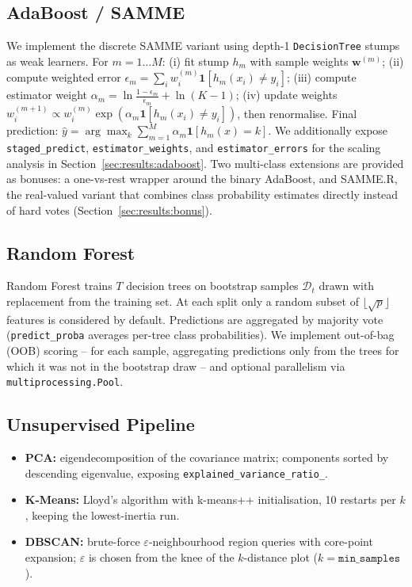 \documentclass[conference]{IEEEtran}
\begin{document}
\subsection{AdaBoost / SAMME}
\label{sec:methods:adaboost}
We implement the discrete SAMME variant \cite{zhu2009multiclass} using depth-1
\texttt{DecisionTree} stumps as weak learners. For $m = 1 \ldots M$: (i) fit
stump $h_m$ with sample weights $\mathbf{w}^{(m)}$; (ii) compute weighted error
$\epsilon_m = \sum_i w_i^{(m)} \mathbf{1}[h_m(x_i)\neq y_i]$; (iii) compute
estimator weight $\alpha_m = \ln\frac{1-\epsilon_m}{\epsilon_m} + \ln(K-1)$;
(iv) update weights $w_i^{(m+1)} \propto w_i^{(m)}
\exp(\alpha_m \mathbf{1}[h_m(x_i)\neq y_i])$, then renormalise. Final prediction:
$\hat{y} = \arg\max_k \sum_{m=1}^{M} \alpha_m \mathbf{1}[h_m(x)=k]$. We additionally
expose \texttt{staged\_predict}, \texttt{estimator\_weights}, and
\texttt{estimator\_errors} for the scaling analysis in
Section~\ref{sec:results:adaboost}. Two multi-class extensions are provided as
bonuses: a one-vs-rest wrapper around the binary AdaBoost, and SAMME.R, the
real-valued variant that combines class probability estimates directly instead
of hard votes (Section~\ref{sec:results:bonus}).

\subsection{Random Forest}
\label{sec:methods:rf}
Random Forest \cite{breiman2001random} trains $T$ decision trees on bootstrap
samples $\mathcal{D}_t$ drawn with replacement from the training set. At each
split only a random subset of $\lfloor\sqrt{p}\rfloor$ features is considered
by default. Predictions are aggregated by majority vote
(\texttt{predict\_proba} averages per-tree class probabilities). We implement
out-of-bag (OOB) scoring -- for each sample, aggregating predictions only from
the trees for which it was not in the bootstrap draw -- and optional
parallelism via \texttt{multiprocessing.Pool}.

\subsection{Unsupervised Pipeline}
\label{sec:methods:unsup}
\begin{itemize}
  \item \textbf{PCA:} eigendecomposition of the covariance matrix; components
        sorted by descending eigenvalue, exposing \texttt{explained\_variance\_ratio\_}.
  \item \textbf{K-Means:} Lloyd's algorithm with k-means++ initialisation, 10
        restarts per $k$, keeping the lowest-inertia run.
  \item \textbf{DBSCAN:} brute-force $\varepsilon$-neighbourhood region
        queries with core-point expansion; $\varepsilon$ is chosen from the knee
        of the $k$-distance plot ($k = \texttt{min\_samples}$).
\end{itemize}
\end{document}
